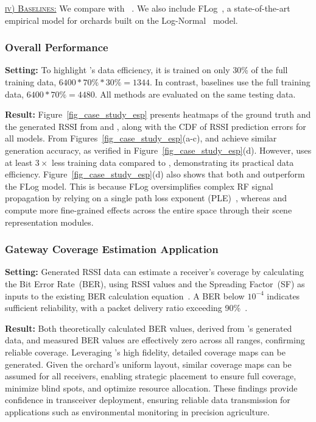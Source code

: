 \underline{\textsc{iv) Baselines:}}
We compare \ourSystem with \nerft~\cite{zhao2023nerf}.  
We also include FLog~\cite{yang2023link}, a state-of-the-art empirical model for orchards built on the Log-Normal~\cite{rappaport1996wireless} model.  




\subsubsection{Overall Performance}  
\textbf{Setting:}
To highlight \ourSystem's data efficiency, it is trained on only 30\% of the full training data, \ie $6400 * 70\% * 30\% = 1344$.  
In contrast, baselines use the full training data, \ie $6400 * 70\% = 4480$.  
All methods are evaluated on the same testing data.






\textbf{Result:}  
Figure~\ref{fig_case_study_esp} presents heatmaps of the ground truth and the generated RSSI from \nerft and \ourSystem, along with the CDF of RSSI prediction errors for all models.  
From Figures~\ref{fig_case_study_esp}(a-c), \ourSystem and \nerft achieve similar generation accuracy, as verified in Figure~\ref{fig_case_study_esp}(d).  
However, \ourSystem uses at least $3\times$ less training data compared to \nerft, demonstrating its practical data efficiency.  
Figure~\ref{fig_case_study_esp}(d) also shows that both \ourSystem and \nerft outperform the FLog model.  
This is because FLog oversimplifies complex RF signal propagation by relying on a single path loss exponent (PLE)~\cite{rappaport1996wireless}, whereas \ourSystem and \nerft compute more fine-grained effects across the entire space through their scene representation modules.  




\subsubsection{Gateway Coverage Estimation Application}  

\textbf{Setting:}
Generated RSSI data can estimate a receiver's coverage by calculating the Bit Error Rate~(BER), using RSSI values and the Spreading Factor~(SF) as inputs to the existing BER calculation equation~\cite{elshabrawy2018closed}.  
A BER below $10^{-4}$ indicates sufficient reliability, with a packet delivery ratio exceeding 90\%~\cite{kasi2020towards}. 


\textbf{Result:}  
Both theoretically calculated BER values, derived from \ourSystem's generated data, and measured BER values are effectively zero across all ranges, confirming reliable coverage.  
Leveraging \ourSystem's high fidelity, detailed coverage maps can be generated.  
Given the orchard's uniform layout, similar coverage maps can be assumed for all receivers, enabling strategic placement to ensure full coverage, minimize blind spots, and optimize resource allocation.  
These findings provide confidence in transceiver deployment, ensuring reliable data transmission for applications such as environmental monitoring in precision agriculture.  




